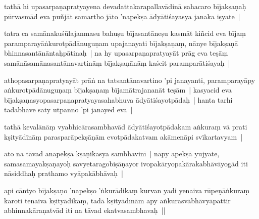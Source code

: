 \documentclass[article,12pt,a4paper]{memoir}%
\newcounter{parCount}
\begin{document}
	  
	  \pstart \leavevmode%
	\label{thakur75-79.13}tathā hi upasarpaṇapratyayena devadattakarapallavādinā sahacaro bījakṣaṇaḥ pūrvasmād eva puñjāt samartho jāto 'napekṣa ādyātiśayasya janaka iṣyate | 
	{}
	\pend%
      

	  
	  \pstart \leavevmode%
	\label{thakur75-79.15}tatra ca samānakuśūlajanmasu bahuṣu bījasantāneṣu kasmāt kiñcid eva bījaṃ paramparayāṅkurotpādānuguṇam upajanayati bījakṣaṇaṃ, nānye bījakṣaṇā bhinnasantānāntaḥpātinaḥ | na hy upasarpaṇapratyayāt prāg eva teṣāṃ samānāsamānasantānavartināṃ bījakṣaṇānāṃ kaścit paramparātiśayaḥ | 
	{}
	\pend%
      

	  
	  \pstart \leavevmode%
	\label{thakur75-79.18}athopasarpaṇapratyayāt prāṅ na tatsantānavartino 'pi janayanti, paramparayāpy aṅkurotpādānuguṇaṃ bījakṣaṇaṃ bījamātrajananāt teṣām | kasyacid eva bījakṣaṇasyopasarpaṇapratyayasahabhuva ādyātiśayotpādaḥ | hanta tarhi tadabhāve saty utpanno 'pi janayed eva | 
	{}
	\pend%
      

	  
	  \pstart \leavevmode%
	\label{thakur75-79.21}tathā kevalānāṃ vyabhicārasambhavād ādyātiśayotpādakam aṅkuraṃ vā prati kṣityādīnāṃ parasparāpekṣāṇām evotpādakatvam akāmenāpi svīkartavyam | 
	{}
	\pend%
      

	  
	  \pstart \leavevmode%
	\label{thakur75-79.22}ato na tāvad anapekṣā kṣaṇikasya sambhavinī | nāpy apekṣā yujyate, samasamayakṣaṇayoḥ savyetaragobiṣāṇayor ivopakāryopakārakabhāvāyogād iti nāsiddhaḥ prathamo vyāpakābhāvaḥ |
	{}
	\pend%
      

	  
	  \pstart \leavevmode%
	\label{thakur75-79.25}api cāntyo bījakṣaṇo 'napekṣo 'ṅkurādikaṃ kurvan yadi yenaiva rūpeṇāṅkuraṃ karoti tenaiva kṣityādikaṃ, tadā kṣityādīnām apy aṅkurasvābhāvyāpattir abhinnakāraṇatvād iti na tāvad ekatvasambhavaḥ ||
	{}
	\pend%
      
\end{document}

